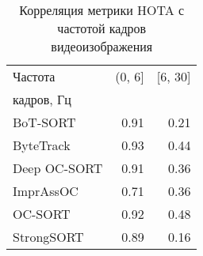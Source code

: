 \begin{table}[htbp]
\caption{Корреляция метрики HOTA с частотой кадров видеоизображения}
\label{tab:correlation_hota_fpsbench_tracker}
\centering
\begin{tabular}{lrr}
\toprule
Частота & (0, 6] & [6, 30] \\
кадров, Гц &  &  \\
\midrule
BoT-SORT & 0.91 & 0.21 \\
ByteTrack & 0.93 & 0.44 \\
Deep OC-SORT & 0.91 & 0.36 \\
ImprAssOC & 0.71 & 0.36 \\
OC-SORT & 0.92 & 0.48 \\
StrongSORT & 0.89 & 0.16 \\
\bottomrule
\end{tabular}

\end{table}